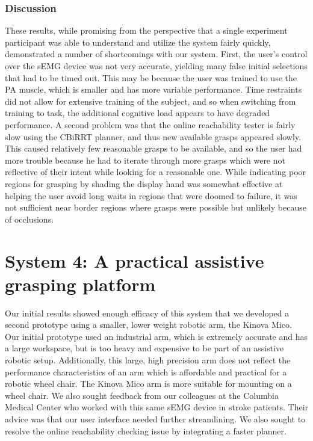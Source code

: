 \subsubsection{Discussion}
These results, while promising from the perspective that a single experiment participant was able to understand and utilize the system fairly quickly, demonstrated a number of shortcomings with our system. First, the user's control over the sEMG device was not very accurate, yielding many false initial selections that had to be timed out. This may be because the user was trained to use the PA muscle, which is smaller and has more variable performance. Time restraints did not allow for extensive training of the subject, and so when switching from training to task, the additional cognitive load appears to have degraded performance. A second problem was that the online reachability tester is fairly slow using the CBiRRT planner, and thus new available grasps appeared slowly. This caused relatively few reasonable grasps to be available, and so the user had more trouble because he had to iterate through more grasps which were not reflective of their intent while looking for a reasonable one. While indicating poor regions for grasping by shading the display hand was somewhat effective at helping the user avoid long waits in regions that were doomed to failure, it was not sufficient near border regions where grasps were possible but unlikely because of occlusions. 

\section*{System 4: A practical assistive grasping platform}
\setcounter{subsection}{0}
\renewcommand*{\theHsection}{chX.\the\value{section}}
Our initial results showed enough efficacy of this system that we developed a second prototype using a smaller, lower weight robotic arm, the Kinova Mico. Our initial prototype used an industrial arm, which is extremely accurate and has a large workspace, but is too heavy and expensive to be part of an assistive robotic setup. Additionally, this large, high precision arm does not reflect the performance characteristics of an arm which is affordable and practical for a robotic wheel chair. The Kinova Mico arm is more suitable for mounting on a wheel chair. 
We also sought feedback from our colleagues at the Columbia Medical Center who worked with this same sEMG device in stroke patients. Their advice was that our user interface needed further streamlining. We also sought to resolve the online reachability checking issue by integrating a faster planner. 

